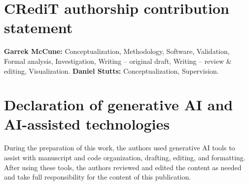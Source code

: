 \documentclass[11pt]{article}
\begin{document}
\section*{CRediT authorship contribution statement}
\textbf{Garrek McCune:} Conceptualization, Methodology, Software,
Validation, Formal analysis, Investigation, Writing -- original draft,
Writing -- review \& editing, Visualization. \textbf{Daniel Stutts:}
Conceptualization, Supervision.

\section*{Declaration of generative AI and AI-assisted technologies}
During the preparation of this work, the authors used generative AI tools
to assist with manuscript and code organization, drafting, editing, and
formatting. After using these tools, the authors reviewed and edited the
content as needed and take full responsibility for the content of this
publication.
\normalsize
\end{document}
